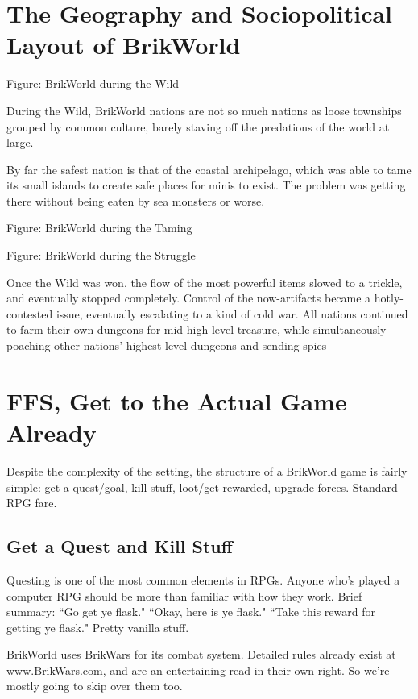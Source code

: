 \documentclass[12pt,a4paper,twocolumn]{article}
\begin{document}
\section{The Geography and Sociopolitical Layout of BrikWorld}

Figure: BrikWorld during the Wild

During the Wild, BrikWorld nations are not so much nations as loose townships grouped by common culture, barely staving off the predations of the world at large.  

By far the safest nation is that of the coastal archipelago, which was able to tame its small islands to create safe places for minis to exist.  The problem was getting there without being eaten by sea monsters or worse.



Figure: BrikWorld during the Taming

Figure: BrikWorld during the Struggle

Once the Wild was won, the flow of the most powerful items slowed to a trickle, and eventually stopped completely.  Control of the now-artifacts became a hotly-contested issue, eventually escalating to a kind of cold war.  All nations continued to farm their own dungeons for mid-high level treasure, while simultaneously poaching other nations' highest-level dungeons and sending spies 

\section{FFS, Get to the Actual Game Already}

Despite the complexity of the setting, the structure of a BrikWorld game is fairly simple: get a quest/goal, kill stuff, loot/get rewarded, upgrade forces.  Standard RPG fare.

\subsection{Get a Quest and Kill Stuff}

Questing is one of the most common elements in RPGs. Anyone who's played a computer RPG should be more than familiar with how they work.  Brief summary: ``Go get ye flask." ``Okay, here is ye flask." ``Take this reward for getting ye flask."  Pretty vanilla stuff.  

BrikWorld uses BrikWars for its combat system.  Detailed rules already exist at www.BrikWars.com, and are an entertaining read in their own right.  So we're mostly going to skip over them too.  
\end{document}
